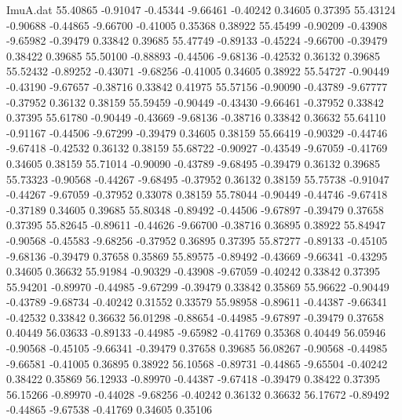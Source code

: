 \begin{filecontents}{ImuA.dat}
  55.40865   -0.91047   -0.45344   -9.66461   -0.40242    0.34605    0.37395
  55.43124   -0.90688   -0.44865   -9.66700   -0.41005    0.35368    0.38922
  55.45499   -0.90209   -0.43908   -9.65982   -0.39479    0.33842    0.39685
  55.47749   -0.89133   -0.45224   -9.66700   -0.39479    0.38422    0.39685
  55.50100   -0.88893   -0.44506   -9.68136   -0.42532    0.36132    0.39685
  55.52432   -0.89252   -0.43071   -9.68256   -0.41005    0.34605    0.38922
  55.54727   -0.90449   -0.43190   -9.67657   -0.38716    0.33842    0.41975
  55.57156   -0.90090   -0.43789   -9.67777   -0.37952    0.36132    0.38159
  55.59459   -0.90449   -0.43430   -9.66461   -0.37952    0.33842    0.37395
  55.61780   -0.90449   -0.43669   -9.68136   -0.38716    0.33842    0.36632
  55.64110   -0.91167   -0.44506   -9.67299   -0.39479    0.34605    0.38159
  55.66419   -0.90329   -0.44746   -9.67418   -0.42532    0.36132    0.38159
  55.68722   -0.90927   -0.43549   -9.67059   -0.41769    0.34605    0.38159
  55.71014   -0.90090   -0.43789   -9.68495   -0.39479    0.36132    0.39685
  55.73323   -0.90568   -0.44267   -9.68495   -0.37952    0.36132    0.38159
  55.75738   -0.91047   -0.44267   -9.67059   -0.37952    0.33078    0.38159
  55.78044   -0.90449   -0.44746   -9.67418   -0.37189    0.34605    0.39685
  55.80348   -0.89492   -0.44506   -9.67897   -0.39479    0.37658    0.37395
  55.82645   -0.89611   -0.44626   -9.66700   -0.38716    0.36895    0.38922
  55.84947   -0.90568   -0.45583   -9.68256   -0.37952    0.36895    0.37395
  55.87277   -0.89133   -0.45105   -9.68136   -0.39479    0.37658    0.35869
  55.89575   -0.89492   -0.43669   -9.66341   -0.43295    0.34605    0.36632
  55.91984   -0.90329   -0.43908   -9.67059   -0.40242    0.33842    0.37395
  55.94201   -0.89970   -0.44985   -9.67299   -0.39479    0.33842    0.35869
  55.96622   -0.90449   -0.43789   -9.68734   -0.40242    0.31552    0.33579
  55.98958   -0.89611   -0.44387   -9.66341   -0.42532    0.33842    0.36632
  56.01298   -0.88654   -0.44985   -9.67897   -0.39479    0.37658    0.40449
  56.03633   -0.89133   -0.44985   -9.65982   -0.41769    0.35368    0.40449
  56.05946   -0.90568   -0.45105   -9.66341   -0.39479    0.37658    0.39685
  56.08267   -0.90568   -0.44985   -9.66581   -0.41005    0.36895    0.38922
  56.10568   -0.89731   -0.44865   -9.65504   -0.40242    0.38422    0.35869
  56.12933   -0.89970   -0.44387   -9.67418   -0.39479    0.38422    0.37395
  56.15266   -0.89970   -0.44028   -9.68256   -0.40242    0.36132    0.36632
  56.17672   -0.89492   -0.44865   -9.67538   -0.41769    0.34605    0.35106

\end{filecontents}
